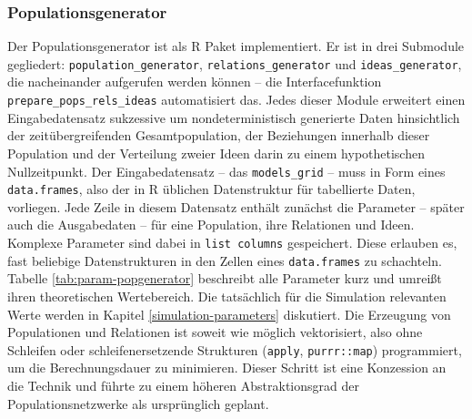 \documentclass[openany,twoside,twocolumn]{book}
\begin{document}
\hypertarget{populationsgenerator}{%
\subsubsection{Populationsgenerator}\label{populationsgenerator}}

Der Populationsgenerator ist als R Paket implementiert. Er ist in drei
Submodule gegliedert: \texttt{population\_generator},
\texttt{relations\_generator} und \texttt{ideas\_generator}, die
nacheinander aufgerufen werden können -- die Interfacefunktion
\texttt{prepare\_pops\_rels\_ideas} automatisiert das. Jedes dieser
Module erweitert einen Eingabedatensatz sukzessive um nondeterministisch
generierte Daten hinsichtlich der zeitübergreifenden Gesamtpopulation,
der Beziehungen innerhalb dieser Population und der Verteilung zweier
Ideen darin zu einem hypothetischen Nullzeitpunkt. Der Eingabedatensatz
-- das \texttt{models\_grid} -- muss in Form eines \texttt{data.frames},
also der in R üblichen Datenstruktur für tabellierte Daten, vorliegen.
Jede Zeile in diesem Datensatz enthält zunächst die Parameter -- später
auch die Ausgabedaten -- für eine Population, ihre Relationen und Ideen.
Komplexe Parameter sind dabei in \texttt{list\ columns} gespeichert.
Diese erlauben es, fast beliebige Datenstrukturen in den Zellen eines
\texttt{data.frames} zu schachteln. Tabelle \ref{tab:param-popgenerator}
beschreibt alle Parameter kurz und umreißt ihren theoretischen
Wertebereich. Die tatsächlich für die Simulation relevanten Werte werden
in Kapitel \ref{simulation-parameters} diskutiert. Die Erzeugung von
Populationen und Relationen ist soweit wie möglich vektorisiert, also
ohne Schleifen oder schleifenersetzende Strukturen (\texttt{apply},
\texttt{purrr::map}) programmiert, um die Berechnungsdauer zu
minimieren. Dieser Schritt ist eine Konzession an die Technik und führte
zu einem höheren Abstraktionsgrad der Populationsnetzwerke als
ursprünglich geplant.
\end{document}
